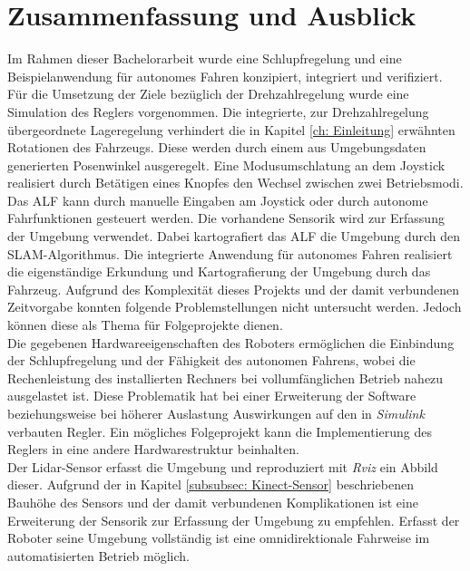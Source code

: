 \chapter{Zusammenfassung und Ausblick}
\label{Fazit und Ausblick}
	

	Im Rahmen dieser Bachelorarbeit wurde eine Schlupfregelung und eine Beispielanwendung
	für autonomes Fahren konzipiert, integriert und verifiziert. Für die Umsetzung der Ziele bezüglich der Drehzahlregelung wurde eine Simulation des Reglers vorgenommen. Die integrierte, zur Drehzahlregelung übergeordnete Lageregelung verhindert die in Kapitel \ref{ch: Einleitung} erwähnten Rotationen des Fahrzeugs. Diese werden durch einem aus Umgebungsdaten generierten Posenwinkel ausgeregelt. Eine Modusumschlatung an dem Joystick realisiert durch Betätigen eines Knopfes den Wechsel zwischen zwei Betriebsmodi. Das ALF kann durch manuelle Eingaben am Joystick oder durch autonome Fahrfunktionen gesteuert werden. Die vorhandene Sensorik wird zur Erfassung der Umgebung verwendet. Dabei kartografiert das ALF die Umgebung durch den SLAM-Algorithmus. Die integrierte Anwendung für autonomes Fahren realisiert die eigenständige Erkundung und Kartografierung der Umgebung durch das Fahrzeug. Aufgrund des Komplexität dieses Projekts und der damit verbundenen Zeitvorgabe konnten folgende Problemstellungen nicht untersucht werden. Jedoch können diese als Thema für Folgeprojekte dienen.    \\
	
	Die gegebenen Hardwareeigenschaften des Roboters ermöglichen die Einbindung der Schlupfregelung und der Fähigkeit des autonomen Fahrens, wobei die Rechenleistung des installierten Rechners bei vollumfänglichen Betrieb nahezu ausgelastet ist. Diese Problematik hat bei einer Erweiterung der Software beziehungsweise bei höherer Auslastung Auswirkungen auf den in \textit{Simulink} verbauten Regler. Ein mögliches Folgeprojekt kann die Implementierung des Reglers in eine andere Hardwarestruktur beinhalten.\\
	
	Der Lidar-Sensor erfasst die Umgebung und reproduziert mit \textit{Rviz} ein Abbild dieser. Aufgrund der in Kapitel \ref{subsubsec: Kinect-Sensor} beschriebenen Bauhöhe des Sensors und der damit verbundenen Komplikationen ist eine Erweiterung der Sensorik zur Erfassung der Umgebung zu empfehlen. Erfasst der Roboter seine Umgebung vollständig ist eine omnidirektionale Fahrweise im automatisierten Betrieb möglich.\\
	
